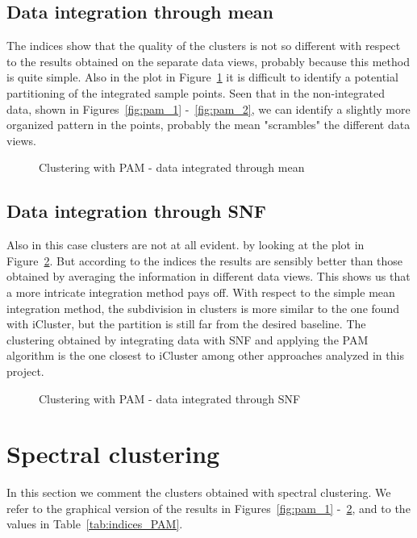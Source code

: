 \subsection*{Data integration through mean}\label{pam_mean}
The indices show that the quality of the clusters is not so different with respect to the results obtained on the separate data views, probably because this method is quite simple. Also in the plot in Figure~\ref{fig:pam_mean} it is difficult to identify a potential partitioning of the integrated sample points. Seen that in the non-integrated data, shown in Figures~\ref{fig:pam_1} -~\ref{fig:pam_2}, we can identify a slightly more organized pattern in the points, probably the mean "scrambles" the different data views.
\begin{figure}[!]
    \centering
    \caption{Clustering with PAM - data integrated through mean}
    \label{fig:pam_mean}
\end{figure}

\subsection*{Data integration through SNF}\label{pam_SNF}
Also in this case clusters are not at all evident. by looking at the plot in Figure~\ref{fig:pam_SNF}. But according to the indices the results are sensibly better than those obtained by averaging the information in different data views. This shows us that a more intricate integration method pays off. With respect to the simple mean integration method, the subdivision in clusters is more similar to the one found with iCluster, but the partition is still far from the desired baseline. The clustering obtained by integrating data with SNF and applying the PAM algorithm is the one closest to iCluster among other approaches analyzed in this project.
\begin{figure}[!]
    \centering
    \caption{Clustering with PAM - data integrated through SNF}
    \label{fig:pam_SNF}
\end{figure}

\section{Spectral clustering}\label{results_sc}
In this section we comment the clusters obtained with spectral clustering. We refer to the graphical version of the results in Figures~\ref{fig:pam_1} -~\ref{fig:pam_SNF}, and to the values in Table~\ref{tab:indices_PAM}.

